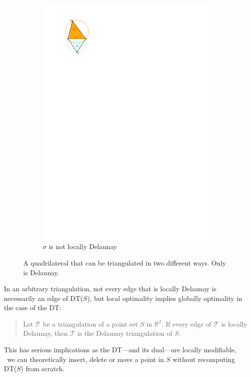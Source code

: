 \begin{figure}
\begin{subfigure}[b]{0.45\linewidth}
		\includegraphics[width=\textwidth,page=2]{figs/local}
		\caption{$\sigma$ is not locally Delaunay}\label{fig:local:b}
	\end{subfigure}%
	\caption{A quadrilateral that can be triangulated in two different ways. Only  is Delaunay.}
	\label{fig:local}
\end{figure}
In an arbitrary triangulation, not every edge that is locally Delaunay is necessarily an edge of DT($S$), but local optimality implies globally optimality in the case of the DT:
\begin{quote}
  Let $\mathcal{T}$ be a triangulation of a point set $S$ in $\mathbb{R}^2$. If every edge of $\mathcal{T}$ is locally Delaunay, then $\mathcal{T}$ is the Delaunay triangulation of $S$.
\end{quote}
This has serious implications as the DT---and its dual---are locally modifiable, \ie\ we can theoretically insert, delete or move a point in $S$ without recomputing DT($S$) from scratch.



